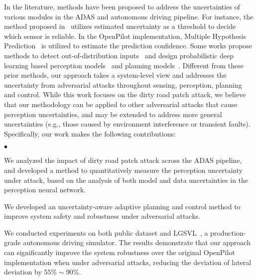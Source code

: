 \documentclass[letterpaper, 10 pt, conference]{ieeeconf}
\newenvironment{myitemize}{\begin{list}{$\bullet$}
{\setlength{\topsep}{1mm}
\setlength{\itemsep}{0.25mm}
\setlength{\parsep}{0.25mm}
\setlength{\itemindent}{0mm}
\setlength{\partopsep}{0mm}
\setlength{\labelwidth}{15mm}
\setlength{\leftmargin}{4mm}}}{\end{list}}
\begin{document}
In the literature, methods have been proposed to address the uncertainties of various modules in the ADAS and autonomous driving pipeline. For instance, the method proposed in~\cite{nakashima2020uncertainty} utilizes estimated uncertainty as a threshold to decide which sensor is reliable. %
In the OpenPilot implementation, Multiple Hypothesis Prediction~\cite{rupprecht2017learning} is utilized to estimate the prediction confidence. Some works propose methods to detect out-of-distribution inputs~\cite{cai2020real} and design probabilistic deep learning based perception models~\cite{sun2018probabilistic} and planning models~\cite{hruschka2019uncertainty}. Different from these prior methods, our approach takes a system-level view and addresses the uncertainty from adversarial attacks throughout sensing, perception, planning and control. While this work focuses on the dirty road patch attack, we believe that our methodology can be applied to other adversarial attacks that cause perception uncertainties, and may be extended to address more general uncertainties (e.g., those caused by environment interference or transient faults).  
Specifically, our work makes the following contributions:
\begin{myitemize}
    \item We analyzed the impact of dirty road patch attack across the ADAS pipeline, and developed a method to quantitatively measure the perception uncertainty under attack, based on the analysis of both model and data uncertainties in the perception neural network. 
    \item We developed an uncertainty-aware adaptive planning and control method to improve system safety and robustness under adversarial attacks. 
    \item We conducted experiments on both public dataset and LGSVL~\cite{rong2020lgsvl}, a production-grade autonomous driving simulator. The results demonstrate that our approach can significantly improve the system robustness over the original OpenPilot implementation when under adversarial attacks, reducing the deviation of lateral deviation by $55\%\sim90\%$.
\end{myitemize}
\end{document}
